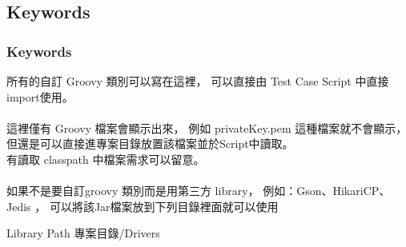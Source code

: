 \documentclass{beamer}
\begin{document}
\subsection{Keywords}
\begin{frame}
    \frametitle{Keywords}
    所有的自訂 Groovy 類別可以寫在這裡，
    可以直接由 Test Case Script 中直接import使用。
    ~\\~\\
    這裡僅有 Groovy 檔案會顯示出來，
    例如 privateKey.pem 這種檔案就不會顯示，
    但還是可以直接進專案目錄放置該檔案並於Script中讀取。\\
    有讀取 classpath 中檔案需求可以留意。
    ~\\~\\
    如果不是要自訂groovy 類別而是用第三方 library，
    例如：Gson、HikariCP、Jedis ，
    可以將該Jar檔案放到下列目錄裡面就可以使用
    \begin{block}{Library Path}
        專案目錄/Drivers
    \end{block}
\end{frame}
\label{reports}
\end{document}
